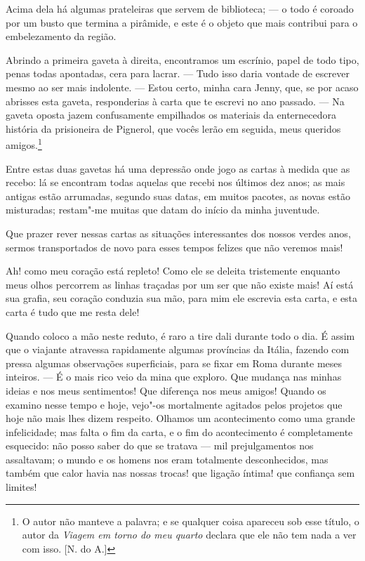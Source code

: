  Acima dela há algumas prateleiras que servem de biblioteca; --- o todo
é coroado por um busto que termina a pirâmide, e este é o objeto que
mais contribui para o embelezamento da região.

 Abrindo a primeira gaveta à direita, encontramos um escrínio, papel de
todo tipo, penas todas apontadas, cera para lacrar. --- Tudo isso daria
vontade de escrever mesmo ao ser mais indolente. --- Estou certo, minha
cara Jenny, que, se por acaso abrisses esta gaveta, responderias à
carta que te escrevi no ano passado. --- Na gaveta oposta jazem
confusamente empilhados os materiais da enternecedora história da
prisioneira de Pignerol, que vocês lerão em seguida, meus queridos
amigos.\footnote{ O autor não manteve a palavra; e se qualquer coisa
apareceu sob esse título, o autor da \textit{Viagem em torno do meu
quarto} declara que ele não tem nada a ver com isso. [N. do A.]} 

 Entre estas duas gavetas há uma depressão onde jogo as cartas à medida
que as recebo: lá se encontram todas aquelas que recebi nos últimos dez
anos; as mais antigas estão arrumadas, segundo suas datas, em muitos
pacotes, as novas estão misturadas; restam"-me muitas que datam do
início da minha juventude.

 Que prazer rever nessas cartas as situações interessantes dos nossos
verdes anos, sermos transportados de novo para esses tempos felizes que
não veremos mais!

 Ah! como meu coração está repleto! Como ele se deleita tristemente
enquanto meus olhos percorrem as linhas traçadas por um ser que não
existe mais! Aí está sua grafia, seu coração conduzia sua mão, para mim
ele escrevia esta carta, e esta carta é tudo que me resta dele!

 Quando coloco a mão neste reduto, é raro a tire dali durante todo o
dia. É assim que o viajante atravessa rapidamente algumas províncias da
Itália, fazendo com pressa algumas observações superficiais, para se
fixar em Roma durante meses inteiros. --- É o mais rico veio da mina
que exploro. Que mudança nas minhas ideias e nos meus sentimentos! Que
diferença nos meus amigos! Quando os examino nesse tempo e hoje,
vejo"-os mortalmente agitados pelos projetos que hoje não mais lhes
dizem respeito. Olhamos um acontecimento como uma grande infelicidade;
mas falta o fim da carta, e o fim do acontecimento é completamente
esquecido: não posso saber do que se tratava --- mil prejulgamentos
nos assaltavam; o mundo e os homens nos eram totalmente desconhecidos,
mas também que calor havia nas nossas trocas! que ligação íntima! que
confiança sem limites!

